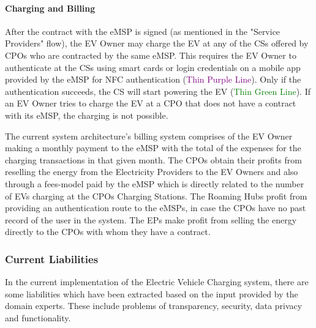 \paragraph{Charging and Billing}

After the contract with the eMSP is signed (as mentioned in the "Service Providers" flow), the EV Owner may charge the EV at any of the CSs offered by CPOs who are contracted by the same eMSP. This requires the EV Owner to authenticate at the CSs using smart cards or login credentials on a mobile app provided by the eMSP for NFC authentication (\textcolor{purple}{Thin Purple Line}). Only if the authentication succeeds, the CS will start powering the EV (\textcolor{green}{Thin Green Line}). If an EV Owner tries to charge the EV at a CPO that does not have a contract with its eMSP, the charging is not possible.

The current system architecture's billing system comprises of the EV Owner making a monthly payment to the eMSP with the total of the expenses for the charging transactions in that given month. The CPOs obtain their profits from reselling the energy from the Electricity Providers to the EV Owners and also through a fees-model paid by the eMSP which is directly related to the number of EVs charging at the CPOs Charging Stations. The Roaming Hubs profit from providing an authentication route to the eMSPs, in case the CPOs have no past record of the user in the system. The EPs make profit from selling the energy directly to the CPOs with whom they have a contract.


\subsubsection{Current Liabilities}
\label{subsubsec:current_liabities}

In the current implementation of the Electric Vehicle Charging system, there are some liabilities which have been extracted based on the input provided by the domain experts. These include problems of transparency, security, data privacy and functionality.

